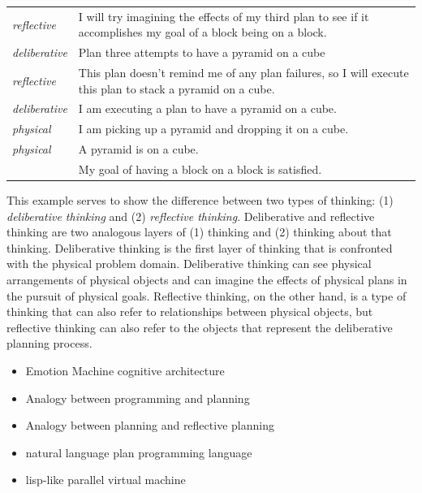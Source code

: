 \begin{tabular}{p{2cm}p{8cm}}
  {\emph{reflective}} & I will try imagining the effects of my third
  plan to see if it accomplishes my goal of a block being on a
  block. \\
  
  {\emph{deliberative}} & Plan three attempts to have a pyramid on a cube \\
  
  {\emph{reflective}} & This plan doesn't remind me of any plan
  failures, so I will execute this plan to stack a pyramid on a
  cube. \\

  {\emph{deliberative}} & I am executing a plan to have a pyramid on a cube. \\
  
  {\emph{physical}} & I am picking up a pyramid and dropping it on a cube. \\

  {\emph{physical}} & A pyramid is on a cube. \\

  & My goal of having a block on a block is satisfied. \\
\end{tabular}


This example serves to show the difference between two types of
thinking: (1) {\emph{deliberative thinking}} and (2) {\emph{reflective
    thinking}}.  Deliberative and reflective thinking are two
analogous layers of (1) thinking and (2) thinking about that thinking.
Deliberative thinking is the first layer of thinking that is
confronted with the physical problem domain.  Deliberative thinking
can see physical arrangements of physical objects and can imagine the
effects of physical plans in the pursuit of physical goals.
Reflective thinking, on the other hand, is a type of thinking that can
also refer to relationships between physical objects, but reflective
thinking can also refer to the objects that represent the deliberative
planning process.

\begin{itemize}
\item{Emotion Machine cognitive architecture}
\item{Analogy between programming and planning}
\item{Analogy between planning and reflective planning}
\item{natural language plan programming language}
\item{lisp-like parallel virtual machine}
\end{itemize}

